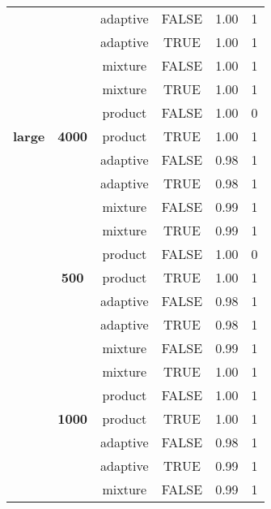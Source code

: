 \documentclass[
]{article}
\begin{document}
\begin{tabular}[t]{>{}c>{}ccccc}
 &  & adaptive & FALSE & 1.00 & 1\\

 &  & adaptive & TRUE & 1.00 & 1\\

 &  & mixture & FALSE & 1.00 & 1\\

 &  & mixture & TRUE & 1.00 & 1\\

 &  & product & FALSE & 1.00 & 0\\

\multirow{-24}{*}{\centering\arraybackslash \textbf{large}} & \multirow{-6}{*}{\centering\arraybackslash \textbf{4000}} & product & TRUE & 1.00 & 1\\
\cmidrule{1-6}
 &  & adaptive & FALSE & 0.98 & 1\\

 &  & adaptive & TRUE & 0.98 & 1\\

 &  & mixture & FALSE & 0.99 & 1\\

 &  & mixture & TRUE & 0.99 & 1\\

 &  & product & FALSE & 1.00 & 0\\

 & \multirow{-6}{*}{\centering\arraybackslash \textbf{500}} & product & TRUE & 1.00 & 1\\

 &  & adaptive & FALSE & 0.98 & 1\\

 &  & adaptive & TRUE & 0.98 & 1\\

 &  & mixture & FALSE & 0.99 & 1\\

 &  & mixture & TRUE & 1.00 & 1\\

 &  & product & FALSE & 1.00 & 1\\

 & \multirow{-6}{*}{\centering\arraybackslash \textbf{1000}} & product & TRUE & 1.00 & 1\\

 &  & adaptive & FALSE & 0.98 & 1\\

 &  & adaptive & TRUE & 0.99 & 1\\

 &  & mixture & FALSE & 0.99 & 1\\


\end{tabular}
\end{document}

